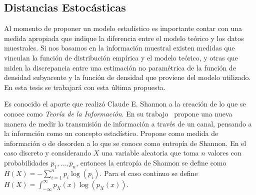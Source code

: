 %




\subsection{Distancias Estocásticas}

Al momento de proponer un modelo estadístico es importante contar con una medida apropiada que indique la diferencia entre el modelo teórico y los datos muestrales. Si nos basamos en la información muestral existen medidas que vinculan la función de distribución empírica y el modelo teórico, y otras que miden la discrepancia entre una estimación no paramétrica de la función de densidad subyacente y la función de densidad que proviene del modelo utilizado. En esta tesis se trabajará con esta última propuesta.

Es conocido el aporte que realizó Claude E. Shannon a la creaci\'on de lo que se conoce como \textit{Teoría de la Información}. En su trabajo~\cite{Shannon1948} propone una nueva manera de medir la transmisi\'on de informaci\'on a trav\'es de un canal, pensando a la informci\'on como un concepto estad\'istico. Propone como medida de informaci\'on o de desorden a lo que se conoce como entrop\'ia de Shannon. En el caso discreto y considerando $X$ una variable aleatoria que toma $n$ valores con probabilidades $p_1,\ldots,p_n$, entonces la entrop\'ia de Shannon se define como $H(X)=-\sum_{i=1}^n p_i \log(p_i)$. Para el caso continuo se define $H(X)=\int_{-\infty}^{\infty} p_X(x) \log(p_X(x)).$

